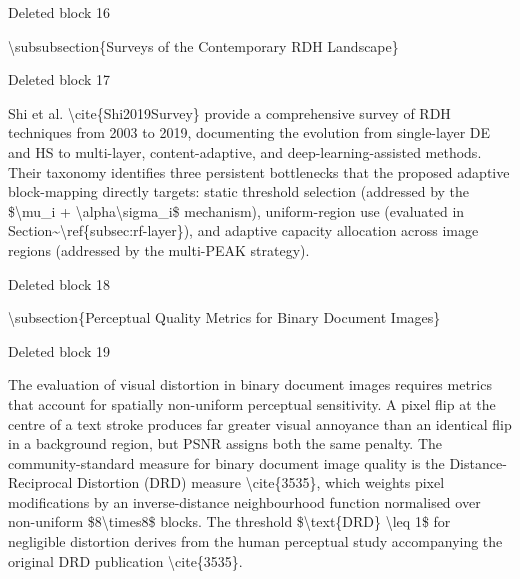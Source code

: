 \documentclass[a4paper,fleqn]{cas-dc}
\newenvironment{RevisionDeletion}{%
  \par\begingroup\color{revisionred}\footnotesize\ttfamily
  \setlength{\parindent}{0pt}\setlength{\parskip}{1pt}\obeyspaces
}{\par\endgroup}
\begin{document}
\begin{RevisionDeletion}
Deleted block 16\par
\textbackslash{}subsubsection\{Surveys of the Contemporary RDH Landscape\}\par
\end{RevisionDeletion}

\begin{RevisionDeletion}
Deleted block 17\par
Shi et al. \textbackslash{}cite\{Shi2019Survey\} provide a comprehensive survey of RDH techniques from 2003 to 2019, documenting the evolution from single-layer DE and HS to multi-layer, content-adaptive, and deep-learning-assisted methods. Their taxonomy identifies three persistent bottlenecks that the proposed adaptive block-mapping directly targets: static threshold selection (addressed by the \$\textbackslash{}mu\_i + \textbackslash{}alpha\textbackslash{}sigma\_i\$ mechanism), uniform-region use (evaluated in Section\textasciitilde{}\textbackslash{}ref\{subsec:rf-layer\}), and adaptive capacity allocation across image regions (addressed by the multi-PEAK strategy).\par
\end{RevisionDeletion}

\begin{RevisionDeletion}
Deleted block 18\par
\textbackslash{}subsection\{Perceptual Quality Metrics for Binary Document Images\}\par
\end{RevisionDeletion}

\begin{RevisionDeletion}
Deleted block 19\par
The evaluation of visual distortion in binary document images requires metrics that account for spatially non-uniform perceptual sensitivity. A pixel flip at the centre of a text stroke produces far greater visual annoyance than an identical flip in a background region, but PSNR assigns both the same penalty. The community-standard measure for binary document image quality is the Distance-Reciprocal Distortion (DRD) measure \textbackslash{}cite\{3535\}, which weights pixel modifications by an inverse-distance neighbourhood function normalised over non-uniform \$8\textbackslash{}times8\$ blocks. The threshold \$\textbackslash{}text\{DRD\} \textbackslash{}leq 1\$ for negligible distortion derives from the human perceptual study accompanying the original DRD publication \textbackslash{}cite\{3535\}.\par
\end{RevisionDeletion}
\end{document}
